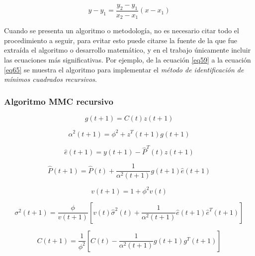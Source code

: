 \documentclass[times,5p, twocolumn]{elsarticle}
\begin{document}
\begin{equation}
y - y_1  = \frac{{y_2  - y_1 }}{{x_2  - x_1 }}\left( {x - x_1 } \right)
\label{eqtn001}
\end{equation}

Cuando se presenta un algoritmo o metodología, no es necesario citar todo el procedimiento a seguir, para evitar esto puede citarse la fuente de la que fue extraída el algoritmo o desarrollo matemático, y en el trabajo únicamente incluir las ecuaciones más significativas. Por ejemplo, de la ecuación \ref{eq59} a la ecuación \ref{eq65} se muestra el algoritmo para implementar el \emph{método de identificación de mínimos cuadrados recursivos}.

\subsubsection{Algoritmo MMC recursivo\\}

\begin{equation}
g(t + 1) = C(t)z(t + 1)
\label{eq59}
\end{equation}

\begin{equation}
\alpha ^2 (t + 1) = \phi ^2  + z^T (t + 1)g(t + 1)
\label{eq60}
\end{equation}

\begin{equation}
\hat e(t + 1) = y(t + 1) - \hat P^T (t)z(t + 1)
\label{eq61}
\end{equation}

\begin{equation}
\hat P(t + 1) = \hat P(t) + \frac{1}{{\alpha ^2 (t + 1)}}g(t + 1)\hat e(t + 1)
\label{eq62}
\end{equation}

\begin{equation}
v(t + 1) = 1 + \phi ^2 v(t)
\label{eq63}
\end{equation}

\begin{equation}
\sigma ^2 (t + 1) = \frac{\phi }{{v(t + 1)}}\left[ {v(t)\hat \sigma ^2 (t) + \frac{1}{{\alpha ^2 (t + 1)}}\hat e(t + 1)\hat e^T (t + 1)} \right]
\label{eq64}
\end{equation}

\begin{equation}
C(t + 1) = \frac{1}{{\phi ^2 }}\left[ {C(t) - \frac{1}{{\alpha ^2 (t + 1)}}g(t + 1)g^T (t + 1)} \right]
\label{eq65}
\end{equation}
\end{document}
